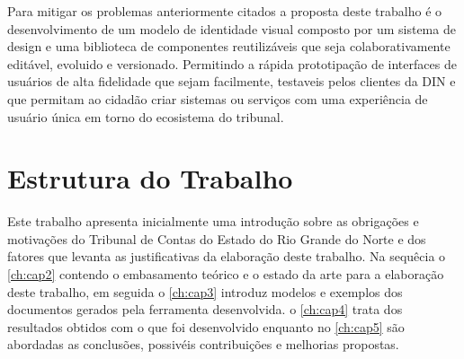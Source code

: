   Para mitigar os problemas anteriormente citados a proposta deste trabalho é o desenvolvimento de um modelo de identidade visual composto por um sistema de design e uma biblioteca de componentes reutilizáveis que seja colaborativamente editável, evoluido e versionado. Permitindo a rápida prototipação de interfaces de usuários de alta fidelidade que sejam facilmente, testaveis pelos clientes da DIN e que permitam ao cidadão criar sistemas ou serviços com uma experiência de usuário única em torno do ecosistema do tribunal.



  \section{Estrutura do Trabalho}
  Este trabalho apresenta inicialmente uma introdução sobre as obrigações e motivações do Tribunal de Contas do Estado do Rio Grande do Norte e dos fatores que levanta as justificativas da elaboração deste trabalho.
  Na sequêcia o \autoref{ch:cap2} contendo o embasamento teórico e o estado da arte para a elaboração deste trabalho, em seguida o \autoref{ch:cap3} introduz modelos e exemplos dos documentos gerados pela ferramenta desenvolvida. o \autoref{ch:cap4} trata dos resultados obtidos com o que foi desenvolvido enquanto no \autoref{ch:cap5} são abordadas as conclusões, possivéis contribuições e melhorias propostas.
